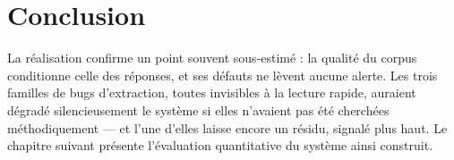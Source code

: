 \section*{Conclusion}

La réalisation confirme un point souvent sous-estimé : la qualité du corpus conditionne celle des
réponses, et ses défauts ne lèvent aucune alerte. Les trois familles de bugs d'extraction, toutes
invisibles à la lecture rapide, auraient dégradé silencieusement le système si elles n'avaient pas
été cherchées méthodiquement --- et l'une d'elles laisse encore un résidu, signalé plus haut. Le
chapitre suivant présente l'évaluation quantitative du système ainsi construit.
